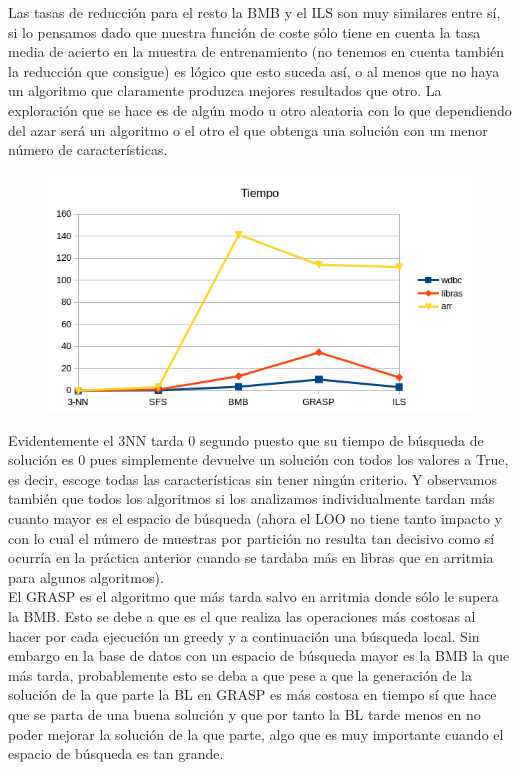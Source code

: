 \documentclass[10pt,a4paper]{article}
\begin{document}
Las tasas de reducción para el resto la BMB y el ILS son muy similares entre sí, si lo pensamos dado que nuestra función de coste sólo tiene en cuenta la tasa media de acierto en la muestra de entrenamiento (no tenemos en cuenta también la reducción que consigue) es lógico que esto suceda así, o al menos que no haya un algoritmo que claramente produzca mejores resultados que otro. La exploración que se hace es de algún modo u otro aleatoria con lo que dependiendo del azar será un algoritmo o el otro el que obtenga una solución con un menor número de características.\\


\begin{figure}[H]
\centering
\includegraphics[width=130mm]{tiempo.png}
\end{figure}


Evidentemente el 3NN tarda 0 segundo puesto que su tiempo de búsqueda de solución es 0 pues simplemente devuelve un solución con todos los valores a True, es decir, escoge todas las características sin tener ningún criterio. Y observamos también que todos los algoritmos si los analizamos individualmente tardan más cuanto mayor es el espacio de búsqueda (ahora el LOO no tiene tanto impacto y con lo cual el número de muestras por partición no resulta tan decisivo como sí ocurría en la práctica anterior cuando se tardaba más en libras que en arritmia para algunos algoritmos).\\

El GRASP es el algoritmo que más tarda salvo en arritmia donde sólo le supera la BMB. Esto se debe a que es el que realiza las operaciones más costosas al hacer por cada ejecución un greedy y a continuación una búsqueda local. Sin embargo en la base de datos con un espacio de búsqueda mayor es la BMB la que más tarda, probablemente esto se deba a que pese a que la generación de la solución de la que parte la BL en GRASP es más costosa en tiempo sí que hace que se parta de una buena solución y que por tanto la BL tarde menos en no poder mejorar la solución de la que parte, algo que es muy importante cuando el espacio de búsqueda es tan grande.
\end{document}
